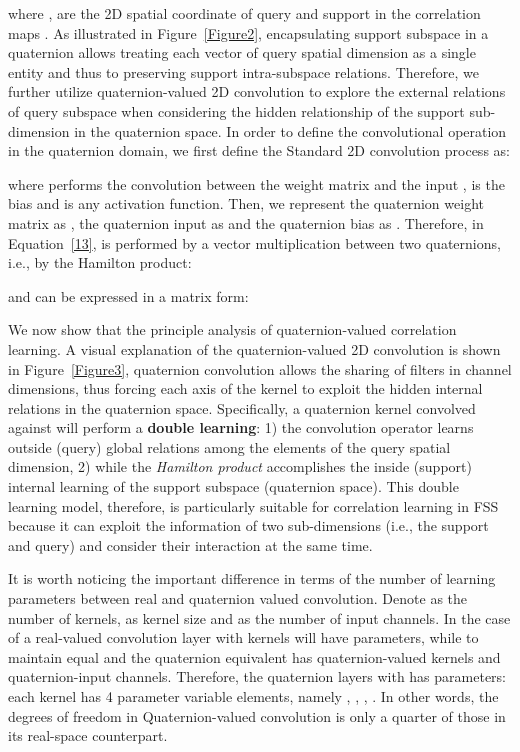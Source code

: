 \documentclass[lettersize,journal]{IEEEtran}
\begin{document}
\noindent where ,  are the 2D spatial coordinate of query and support in the correlation maps . As illustrated in Figure~\ref{Figure2}, encapsulating support subspace in a quaternion allows treating each vector of query spatial dimension as a single entity and thus to preserving support intra-subspace relations. Therefore, we further utilize quaternion-valued 2D convolution to explore the external relations of query subspace when considering the hidden relationship of the support sub-dimension in the quaternion space. 
In order to define the convolutional operation in the quaternion domain, we first define the Standard 2D convolution process as:



where  performs the convolution between the weight matrix  and the input  ,  is the bias and  is any activation function. Then, we represent the quaternion weight matrix as ,  the quaternion input as  and the quaternion bias as . Therefore,  in Equation~\ref{13}, is performed by a vector multiplication between two quaternions, i.e., by the Hamilton product: 

\begin{small}

\end{small}

\noindent and can be expressed in a matrix form:



We now show that the principle analysis of quaternion-valued correlation learning. A visual explanation of the quaternion-valued 2D convolution is shown in Figure~\ref{Figure3}, quaternion convolution allows the sharing of filters in channel dimensions, thus forcing each axis of the kernel to exploit the hidden internal relations in the quaternion space. Specifically, a quaternion kernel convolved against  will perform a \textbf{double learning}: 1) the convolution operator learns outside (query) global relations among the elements of the query spatial dimension, 2) while the \textit{Hamilton product} accomplishes the inside (support) internal learning of the support subspace (quaternion space). This double learning model, therefore, is particularly suitable for correlation learning in FSS because it can exploit the information of two sub-dimensions (i.e., the support and query) and consider their interaction at the same time.

It is worth noticing the important difference in terms of the number of learning parameters between real and quaternion valued convolution. Denote  as the number of kernels,  as kernel size and  as the number of input channels. In the case of a real-valued convolution layer with  kernels will have  parameters, while to maintain equal  and  the quaternion equivalent has  quaternion-valued kernels and  quaternion-input channels. Therefore, the quaternion layers with  has   parameters: each kernel has 4 parameter variable elements, namely , , , . In other words, the degrees of freedom in Quaternion-valued convolution is only a quarter of those in its real-space counterpart. 
\end{document}
